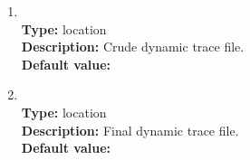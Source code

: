 \begin{enumerate}
\item
{} \\
{\bf Type:} location \\
{\bf Description:} Crude dynamic trace file. \\
{\bf Default value:}  

\item
{} \\
{\bf Type:} location \\
{\bf Description:} Final dynamic trace file. \\
{\bf Default value:} 
\end{enumerate}
